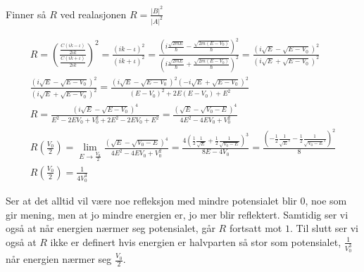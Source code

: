 \documentclass[11pt, A4paper,norsk]{article}
\begin{document}
				\begin{flushleft}
Finner så $R$ ved realasjonen $R = \frac{|B|^2}{|A|^2}$
				\end{flushleft}
				\begin{gather*}
R = \left( \frac{\frac{C(ik - \iota)}{2ik}}{\frac{C(ik + \iota)}{2ik}} \right)^2 = \frac{(ik - \iota)^2}{(ik + \iota)^2} = \frac{( i \frac{\sqrt{2 m E}}{\hbar} - \frac{\sqrt{2 m(E - V_0)}}{\hbar})^2}{(i \frac{\sqrt{2 m E}}{\hbar} + \frac{\sqrt{2 m(E - V_0)}}{\hbar})^2} = \frac{(i \sqrt{E} - \sqrt{E - V_0})^2}{(i \sqrt{E} + \sqrt{E - V_0})^2} \\
\frac{(i \sqrt{E} - \sqrt{E - V_0})^2}{(i \sqrt{E} + \sqrt{E - V_0})^2} = \frac{(i\sqrt{E} - \sqrt{E - V_0})^2(- i\sqrt{E} + \sqrt{E - V_0})^2}{(E - V_0)^2 + 2 E (E - V_0) + E^2} \\
R = \frac{(i\sqrt{E} - \sqrt{E - V_0})^4}{E^2 - 2 E V_0 + V_0^2 + 2 E^2 - 2 E V_0 + E^2} = \frac{(\sqrt{E} - \sqrt{V_0 - E})^4}{4E^2 - 4 E V_0 + V_0^2} \\
R\left( \frac{V_0}{2} \right) = \lim_{E \rightarrow \frac{V_0}{2}} \frac{(\sqrt{E} - \sqrt{V_0 - E})^4}{4E^2 - 4 E V_0 + V_0^2} = \frac{4(\frac{1}{2} \frac{1}{\sqrt{E}} + \frac{1}{2} \frac{1}{\sqrt{V_0 - E}})^3}{8E - 4V_0} = \frac{(- \frac{1}{2} \frac{1}{\sqrt{E}^3} - \frac{1}{2} \frac{1}{\sqrt{V_0 - E}^3})^2}{8} \\
R\left( \frac{V_0}{2} \right) = \frac{1}{4 V_0^3}
				\end{gather*}
				\begin{flushleft}
Ser at det alltid vil være noe refleksjon med mindre potensialet blir $0$, noe som gir mening, men at jo mindre energien er, jo mer blir reflektert. Samtidig ser vi også at når energien nærmer seg potensialet, går $R$ fortsatt mot $1$. Til slutt ser vi også at $R$ ikke er definert hvis energien er halvparten så stor som potensialet, $\frac{1}{V_0^3}$ når energien nærmer seg $\frac{V_0}{2}$.
				\end{flushleft}
\end{document}
